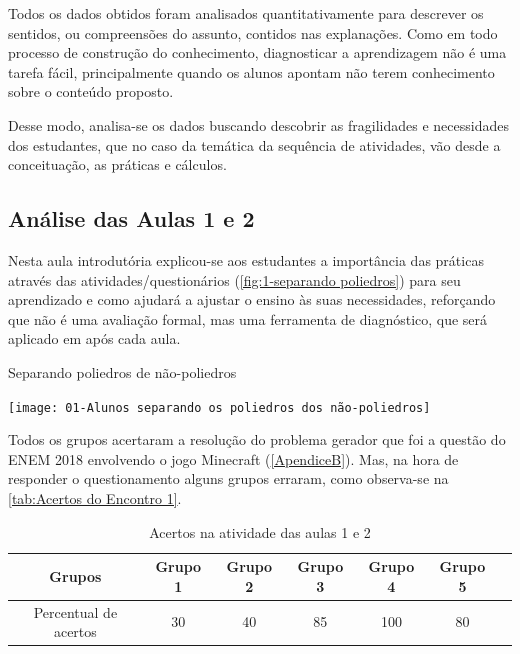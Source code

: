 Todos os dados obtidos foram analisados quantitativamente para descrever os sentidos, ou compreensões do assunto, contidos nas explanações. Como em todo processo de construção do conhecimento, diagnosticar a aprendizagem não é uma tarefa fácil, principalmente quando os alunos apontam não terem conhecimento sobre o conteúdo proposto.

Desse modo, analisa-se os dados buscando descobrir as fragilidades e necessidades dos estudantes, que no caso da temática da sequência de atividades, vão desde a conceituação, as práticas e cálculos.

\subsection{Análise das Aulas 1 e 2}

Nesta aula introdutória explicou-se aos estudantes a importância das práticas através das atividades/questionários (\autoref{fig:1-separando poliedros}) para seu aprendizado e como ajudará a ajustar o ensino às suas necessidades, reforçando que não é uma avaliação formal, mas uma ferramenta de diagnóstico, que será aplicado em após cada aula.

\begin{CenteredFigure}
    \caption{Separando poliedros de não-poliedros} \label{fig:1-separando poliedros}
    \texttt{[image: 01-Alunos separando os poliedros dos não-poliedros]}
    \legend{\autoria}
\end{CenteredFigure}

Todos os grupos acertaram a resolução do problema gerador que foi a questão do ENEM 2018 envolvendo o jogo Minecraft (\autoref{ApendiceB}). Mas, na hora de responder o questionamento alguns grupos erraram, como observa-se na \autoref{tab:Acertos do Encontro 1}.

\begin{table}[htbp] \centering
    \caption{Acertos na atividade das aulas 1 e 2} \label{tab:Acertos do Encontro 1}
    \begin{tabular}{|c|c|c|c|c|c|c|}
        \hline
        \textbf{Grupos}       & \textbf{Grupo 1} & \textbf{Grupo 2} & \textbf{Grupo 3} & \textbf{Grupo 4} & \textbf{Grupo 5} \\
        \hline
        Percentual de acertos & 30               & 40               & 85               & 100              & 80               \\
        \hline
    \end{tabular}
    \legend{\legendaTabela}
\end{table}

